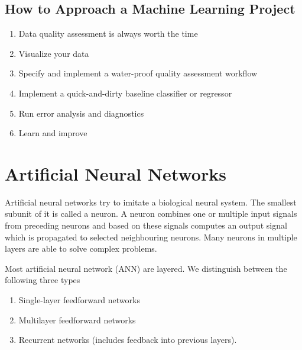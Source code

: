 \documentclass[11pt]{article}
\begin{document}
\subsection{How to Approach a Machine Learning Project}

\begin{enumerate}
    \item Data quality assessment is always worth the time
    \item Visualize your data
    \item Specify and implement a water-proof quality assessment workflow
    \item Implement a quick-and-dirty baseline classifier or regressor
    \item Run error analysis and diagnostics
    \item Learn and improve
\end{enumerate}

\section{Artificial Neural Networks}

Artificial neural networks try to imitate a biological neural system. The smallest subunit of it is called a neuron. A neuron combines one or multiple input signals from preceding neurons and based on these signals computes an output signal which is propagated to selected neighbouring neurons. Many neurons in multiple layers are able to solve complex problems.

Most artificial neural network (ANN) are layered. We distinguish between the following three types
\begin{enumerate}
    \item Single-layer feedforward networks
    \item Multilayer feedforward networks
    \item Recurrent networks (includes feedback into previous layers).
\end{enumerate}
\end{document}
